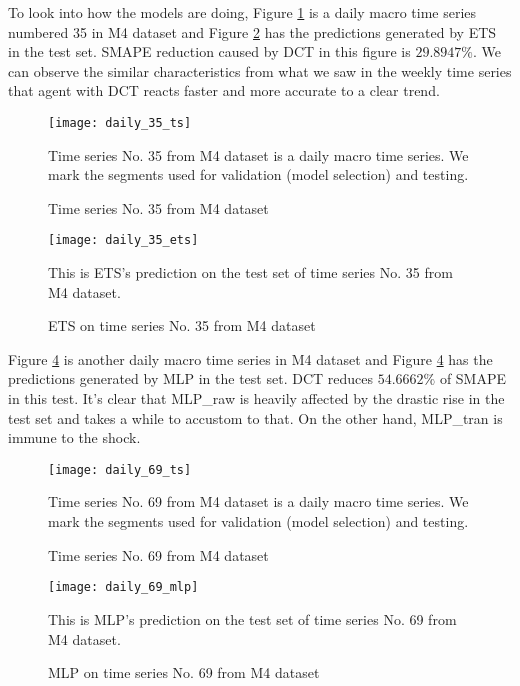 To look into how the models are doing, Figure \ref{fig: daily 35 ts} is a daily macro time series numbered 35 in M4 dataset and Figure \ref{fig: daily 35 ets} has the predictions generated by ETS in the test set. SMAPE reduction caused by DCT in this figure is $29.8947\%$. We can observe the similar characteristics from what we saw in the weekly time series that agent with DCT reacts faster and more accurate to a clear trend.
\begin{figure}[H]
    \centering
    \texttt{[image: daily\_35\_ts]}
    \caption{Time series No. 35 from M4 dataset}
    {\raggedright \footnotesize Time series No. 35 from M4 dataset is a daily macro time series. We mark the segments used for validation (model selection) and testing.\par}
    \label{fig: daily 35 ts}
\end{figure}
\begin{figure}[H]
    \centering
    \texttt{[image: daily\_35\_ets]}
    \caption{ETS on time series No. 35 from M4 dataset}
    {\raggedright \footnotesize This is ETS's prediction on the test set of time series No. 35 from M4 dataset.  \par}
    \label{fig: daily 35 ets}
\end{figure}
Figure \ref{fig: daily 69 mlp} is another daily macro time series in M4 dataset and Figure \ref{fig: daily 69 mlp} has the predictions generated by MLP in the test set. DCT reduces $54.6662\%$ of SMAPE in this test. It's clear that MLP\_raw is heavily affected by the drastic rise in the test set and takes a while to accustom to that. On the other hand, MLP\_tran is immune to the shock.
\begin{figure}[H]
    \centering
    \texttt{[image: daily\_69\_ts]}
    \caption{Time series No. 69 from M4 dataset}
    {\raggedright \footnotesize Time series No. 69 from M4 dataset is a daily macro time series. We mark the segments used for validation (model selection) and testing.\par}
    \label{fig: daily 69 ts}
\end{figure}
\begin{figure}[H]
    \centering
    \texttt{[image: daily\_69\_mlp]}
    \caption{MLP on time series No. 69 from M4 dataset}
    {\raggedright \footnotesize This is MLP's prediction on the test set of time series No. 69 from M4 dataset.  \par}
    \label{fig: daily 69 mlp}
\end{figure}

